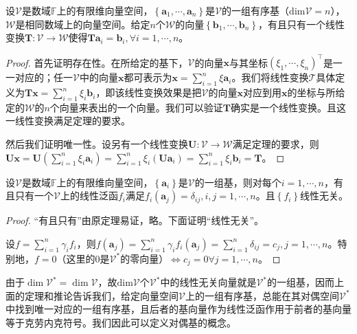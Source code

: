 \documentclass[main.tex]{subfiles}
\begin{document}
\begin{theorem}\label{thm:II.4.16}
设$\mathcal{V}$是数域$\mathbb{F}$上的有限维向量空间，$\left\{\mathbf{a}_1,\cdots,\mathbf{a}_n\right\}$是$\mathcal{V}$的一组有序基（$\mathrm{dim}\mathcal{V}=n$），$\mathcal{W}$是相同数域上的向量空间。给定$n$个$\mathcal{W}$的向量$\left\{\mathbf{b}_1,\cdots,\mathbf{b}_n\right\}$，有且只有一个线性变换$\mathbf{T}:\mathcal{V}\rightarrow\mathcal{W}$使得$\mathbf{Ta}_i=\mathbf{b}_i,\forall i=1,\cdots,n$。
\end{theorem}
\begin{proof}
首先证明存在性。在所给定的基下，$\mathcal{V}$的向量$\mathbf{x}$与其坐标$\left(\xi_1,\cdots,\xi_n\right)^\intercal$是一一对应的；任一$\mathcal{V}$中的向量$\mathbf{x}$都可表示为$\mathbf{x}=\sum_{i=1}^n\xi\mathbf{a}_i$。我们将线性变换$\mathcal{T}$具体定义为$\mathbf{Tx}=\sum_{i=1}^n\xi_i\mathbf{b}_i$，即该线性变换效果是把$\mathcal{V}$的向量$\mathbf{x}$对应到用$\mathbf{x}$的坐标与所给定的$\mathcal{W}$的$n$个向量来表出的一个向量。我们可以验证$\mathbf{T}$确实是一个线性变换。且这一线性变换满足定理的要求。

然后我们证明唯一性。设另有一个线性变换$\mathbf{U}:\mathcal{V}\rightarrow\mathcal{W}$满足定理的要求，则$\mathbf{Ux}=\mathbf{U}\left(\sum_{i=1}^n\xi_i\mathbf{a}_i\right)=\sum_{i=1}^n\xi_i\left(\mathbf{Ua}_i\right)=\sum_{i=1}^n\xi_i\mathbf{b}_i=\mathbf{T}$。
\end{proof}

\begin{corollary}
设$\mathcal{V}$是数域$\mathbb{F}$上的有限维向量空间，$\left\{\mathbf{a}_i\right\}$是$\mathcal{V}$的一组基，则对每个$i=1,\cdots,n$，有且只有一个$\mathcal{V}$上的线性泛函$f_i$满足$f_i\left(\mathbf{a}_j\right)=\delta_{ij},i,j=1,\cdots,n$。且$\left\{f_i\right\}$线性无关。
\end{corollary}
\begin{proof}
“有且只有”由原定理易证，略。下面证明“线性无关”。

设$f=\sum_{i=1}^n\gamma_if_i$，则$f\left(\mathbf{a}_j\right)=\sum_{i=1}^n\gamma_if_i\left(\mathbf{a}_j\right)=\sum_{i=1}^n\delta_{ij}=c_j,j=1,\cdots,n$。特别地，$f=0$（这里的$0$是$\mathcal{V}^*$的零向量）$\Leftrightarrow c_j=0\forall j=1,\cdots,n$。
\end{proof}

由于$\dim\mathcal{V}^*=\dim\mathcal{V}$，故$\mathrm{dim}\mathcal{V}$个$\mathcal{V}^*$中的线性无关向量就是$\mathcal{V}^*$的一组基，因而上面的定理和推论告诉我们，给定向量空间$\mathcal{V}$上的一组有序基，总能在其对偶空间$\mathcal{V}^*$中找到唯一对应的一组有序基，且后者的基向量作为线性泛函作用于前者的基向量等于克劳内克符号。我们因此可以定义对偶基的概念。
\end{document}
